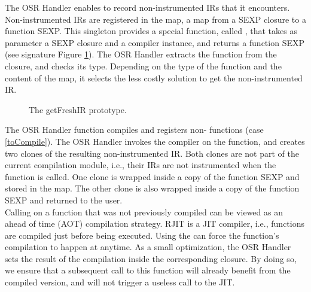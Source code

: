 The OSR Handler enables to record non-instrumented IRs that it encounters.
Non-instrumented IRs are registered in the  map, a map from a SEXP closure to a  function SEXP.
This singleton provides a special function, called , that takes as parameter a SEXP closure and a compiler instance, and returns a function SEXP (see signature Figure \ref{fig:getfreshir}).
The OSR Handler extracts the function from the closure, and checks its type.
Depending on the type of the function and the content of the  map, it selects the less costly solution to get the non-instrumented IR.\\

\begin{figure}[h]
\caption{The getFreshIR prototype.}
\label{fig:getfreshir}
\end{figure}

The OSR Handler  function compiles and registers non- functions (case \ref{toCompile}).
The OSR Handler invokes the compiler on the function, and creates two clones of the resulting non-instrumented IR.
Both clones are not part of the current compilation module, i.e., their IRs are not instrumented when the  function is called.
One clone is wrapped inside a copy of the function SEXP and stored in the  map.
The other clone is also wrapped inside a copy of the function SEXP and returned to the user.\\

Calling  on a function that was not previously compiled can be viewed as an ahead of time (AOT) compilation strategy.
RJIT is a JIT compiler, i.e., functions are compiled just before being executed.
Using the  can force the function's compilation to happen at anytime.
As a small optimization, the OSR Handler sets the result of the compilation inside the corresponding closure.
By doing so, we ensure that a subsequent call to this function will already benefit from the compiled version, and will not trigger a useless call to the JIT.\\

